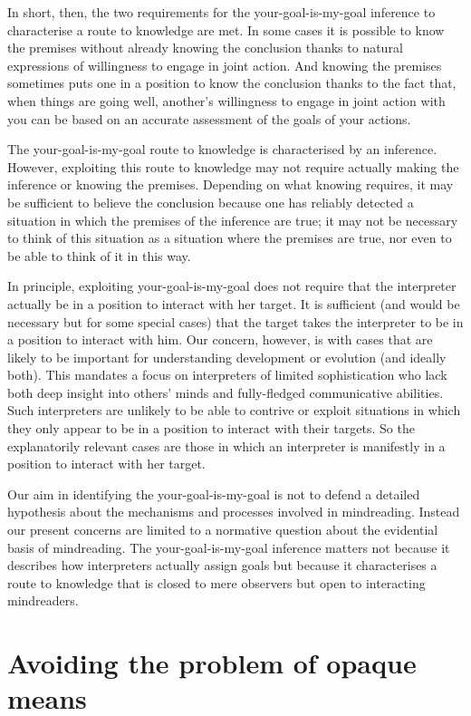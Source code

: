 \documentclass[14pt,a4paper]{extarticle}
\begin{document}
In short, then, the two requirements for the your-goal-is-my-goal inference to characterise a route to knowledge are met.  
In some cases it is possible to know the premises without already knowing the conclusion thanks to natural expressions of willingness to engage in joint action.  
And knowing the premises sometimes puts one in a position to know the conclusion thanks to the fact that, when things are going well, another's willingness to engage in joint action with you can be based on an accurate assessment of the goals of your actions.

The your-goal-is-my-goal route to knowledge is characterised by an inference.  
However, exploiting this route to knowledge may not require actually making the inference or knowing the premises.  
Depending on what knowing requires,
it may be sufficient to believe the conclusion because one has reliably detected a situation in which the premises of the inference are true;
it may not be necessary to think of this situation as a situation where the premises are true,
nor even to be able to think of it in this way.

In principle,
exploiting your-goal-is-my-goal does not require that the interpreter actually be in a position to interact with her target.
It is sufficient (and would be necessary but for some special cases) that the target takes the interpreter to be in a position to interact with him. 
Our concern, however,
is with cases that are likely to be important for understanding
development or evolution (and ideally both).
This mandates a focus on interpreters of limited sophistication
who lack both deep insight into others' minds and fully-fledged communicative abilities.
Such interpreters are unlikely to be able to contrive or exploit situations in which they only appear to be in a position to interact with their targets.
So the explanatorily relevant cases are those 
in which an interpreter is manifestly in a position to interact with her target.


Our aim in identifying the your-goal-is-my-goal is not to 
defend a detailed hypothesis about the mechanisms and processes involved in mindreading.
Instead our present concerns are limited to a normative question about the evidential basis of mindreading.
The your-goal-is-my-goal inference matters
not because it describes how interpreters actually assign goals
but because 
it characterises a route to knowledge
that is closed to mere observers
but open to interacting mindreaders.
 

\section{Avoiding the problem of opaque means}
\end{document}
